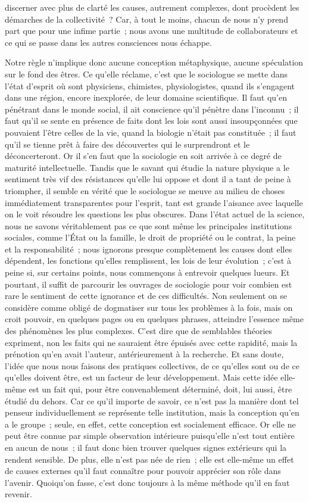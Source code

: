 \documentclass[french,twoside]{book} %
\begin{document}
discerner avec plus de clarté les causes, autrement complexes, dont procèdent les démarches de la collectivité ? Car, à tout le moins, chacun de nous n’y prend part que pour une infime partie ; nous avons une multitude de collaborateurs et ce qui se passe dans les autres consciences nous échappe.\par
Notre règle n’implique donc aucune conception métaphysique, aucune spéculation sur le fond des êtres. Ce qu’elle réclame, c’est que le sociologue se mette dans l’état d’esprit où sont physiciens, chimistes, physiologistes, quand ils s’engagent dans une région, encore inexplorée, de leur domaine scientifique. Il faut qu’en pénétrant dans le monde social, il ait conscience qu’il pénètre dans l’inconnu ; il faut qu’il se sente en présence de faits dont les lois sont aussi insoupçonnées que pouvaient l’être celles de la vie, quand la biologie n’était pas constituée ; il faut qu’il se tienne prêt à faire des découvertes qui le surprendront et le déconcerteront. Or il s’en faut que la sociologie en soit arrivée à ce degré de maturité intellectuelle. Tandis que le savant qui étudie la nature physique a le sentiment très vif des résistances qu’elle lui oppose et dont il a tant de peine à triompher, il semble en vérité que le sociologue se meuve au milieu de choses immédiatement transparentes pour l’esprit, tant est grande l’aisance avec laquelle on le voit résoudre les questions les plus obscures. Dans l’état actuel de la science, nous ne savons véritablement pas ce que sont même les principales institutions sociales, comme l’État ou la famille, le droit de propriété ou le contrat, la peine et la responsabilité ; nous ignorons presque complètement les causes dont elles dépendent, les fonctions qu’elles remplissent, les lois de leur évolution ; c’est à peine si, sur certains points, nous commençons à entrevoir quelques lueurs. Et pourtant, il suffit de parcourir les ouvrages de sociologie pour voir combien est rare le sentiment de cette ignorance et de ces difficultés. Non seulement on se considère comme obligé de dogmatiser sur tous les problèmes à la fois, mais on croit pouvoir, en quelques pages ou en quelques phrases, atteindre l’essence même des phénomènes les plus complexes. C’est dire que de semblables théories expriment, non les faits qui ne sauraient être épuisés avec cette rapidité, mais la prénotion qu’en avait l’auteur, antérieurement à la recherche. Et sans doute, l’idée que nous nous faisons des pratiques collectives, de ce qu’elles sont ou de ce qu’elles doivent être, est un facteur de leur développement. Mais cette idée elle-même est un fait qui, pour être convenablement déterminé, doit, lui aussi, être étudié du dehors. Car ce qu’il importe de savoir, ce n’est pas la manière dont tel penseur individuellement se représente telle institution, mais la conception qu’en a le groupe ; seule, en effet, cette conception est socialement efficace. Or elle ne peut être connue par simple observation intérieure puisqu’elle n’est tout entière en aucun de nous ; il faut donc bien trouver quelques signes extérieurs qui la rendent sensible. De plus, elle n’est pas née de rien ; elle est elle-même un effet de causes externes qu’il faut connaître pour pouvoir apprécier son rôle dans l’avenir. Quoiqu’on fasse, c’est donc toujours à la même méthode qu’il en faut revenir.
\end{document}
